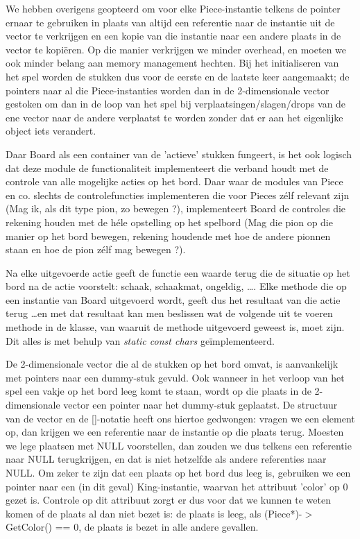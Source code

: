 \documentclass[a4paper,11pt,oneside, titlepage]{article}
\begin{document}
We hebben overigens geopteerd om voor elke Piece-instantie telkens de pointer ernaar te gebruiken in plaats van altijd een referentie naar de instantie uit de vector te verkrijgen en een kopie van die instantie naar een andere plaats in de vector te kopi\"eren. Op die manier verkrijgen we minder overhead, en moeten we ook minder belang aan memory management hechten. Bij het initialiseren van het spel worden de stukken dus voor de eerste en de laatste keer aangemaakt; de pointers naar al die Piece-instanties worden dan in de 2-dimensionale vector gestoken om dan in de loop van het spel bij verplaatsingen/slagen/drops van de ene vector naar de andere verplaatst te worden zonder dat er aan het eigenlijke object iets verandert.

Daar Board als een container van de 'actieve' stukken fungeert, is het ook logisch dat deze module de functionaliteit implementeert die verband houdt met de controle van alle mogelijke acties op het bord. Daar waar de modules van Piece en co. slechts de controlefuncties implementeren die voor Pieces z\'elf relevant zijn (Mag ik, als dit type pion, zo bewegen ?), implementeert Board de controles die rekening houden met de h\'ele opstelling op het spelbord (Mag die pion op die manier op het bord bewegen, rekening houdende met hoe de andere pionnen staan en hoe de pion z\'elf mag bewegen ?).

Na elke uitgevoerde actie geeft de functie een waarde terug die de situatie op het bord na de actie voorstelt: schaak, schaakmat, ongeldig, \ldots. Elke methode die op een instantie van Board uitgevoerd wordt, geeft dus het resultaat van die actie terug \ldots en met dat resultaat kan men beslissen wat de volgende uit te voeren methode in de klasse, van waaruit de methode uitgevoerd geweest is, moet zijn. Dit alles is met behulp van \emph{static const chars} ge\"implementeerd.

De 2-dimensionale vector die al de stukken op het bord omvat, is aanvankelijk met pointers naar een dummy-stuk gevuld. Ook wanneer in het verloop van het spel een vakje op het bord leeg komt te staan, wordt op die plaats in de 2-dimensionale vector een pointer naar het dummy-stuk geplaatst. De structuur van de vector en de []-notatie heeft ons hiertoe gedwongen: vragen we een element op, dan krijgen we een referentie naar de instantie op die plaats terug. Moesten we lege plaatsen met NULL voorstellen, dan zouden we dus telkens een referentie naar NULL terugkrijgen, en dat is niet hetzelfde als andere referenties naar NULL. Om zeker te zijn dat een plaats op het bord dus leeg is, gebruiken we een pointer naar een (in dit geval) King-instantie, waarvan het attribuut 'color' op 0 gezet is. Controle op dit attribuut zorgt er dus voor dat we kunnen te weten komen of de plaats al dan niet bezet is: de plaats is leeg, als (Piece*)-$>$GetColor() == 0, de plaats is bezet in alle andere gevallen.
\end{document}
